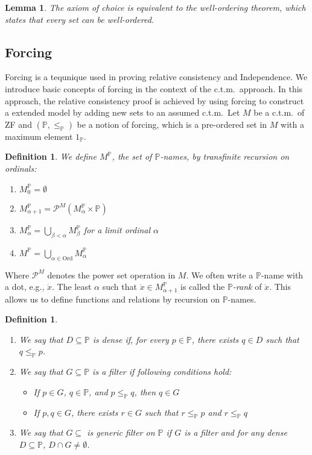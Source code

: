 \documentclass{report}
\newtheorem{lem}[thm]{Lemma}
\newtheorem{dfn}[thm]{Definition}
\begin{document}
\begin{lem}
  The axiom of choice is equivalent to the well-ordering theorem, which states that every set can be well-ordered.
\end{lem}


\subsection{Forcing}
Forcing is a tequnique used in proving relative consistency and Independence.
We introduce basic concepts of forcing in the context of the c.t.m.\  approach.
In this approach, the relative consistency proof is achieved by using forcing to construct a extended model by adding new sets to an assumed c.t.m.\ 
Let $M$ be a c.t.m.\  of ZF and $(\mathbb{P}, \leq_{\mathbb{P}})$ be a notion of forcing, which is a pre-ordered set in $M$ with a maximum element $1_{\mathbb{P}}$.

\begin{dfn}
  We define $M^{\mathbb{P}}$, the set of \emph{$\mathbb{P}$-names}, by transfinite recursion on ordinals:
  \begin{enumerate}
    \item $M^{\mathbb{P}}_0 = \emptyset$
    \item $M^{\mathbb{P}}_{\alpha + 1} = \mathcal{P}^M(M^{\mathbb{P}}_{\alpha} \times \mathbb{P})$
    \item $M^{\mathbb{P}}_{\alpha} = \bigcup_{\beta < \alpha} M^{\mathbb{P}}_{\beta}$ for a limit ordinal $\alpha$
    \item $M^{\mathbb{P}} = \bigcup_{\alpha \in \mathrm{Ord}} M^{\mathbb{P}}_{\alpha}$
  \end{enumerate}
\end{dfn}
Where $\mathcal{P}^M$ denotes the power set operation in $M$. 
We often write a $\mathbb{P}$-name with a dot, e.g., $\dot{x}$.
The least $\alpha$ such that $\dot{x} \in M^{\mathbb{P}}_{\alpha + 1}$ is called the \emph{$\mathbb{P}$-rank} of $\dot{x}$.
This allows us to define functions and relations by recursion on $\mathbb{P}$-names.

\begin{dfn}  
  \,
  \begin{enumerate}
    \item We say that $D \subseteq \mathbb{P}$ is \emph{dense} if, for every $p \in \mathbb{P}$, there exists $q \in D$ such that $q \leq_{\mathbb{P}} p$.
    \item We say that $G \subseteq \mathbb{P}$ is a \emph{filter} if following conditions hold:
      \begin{itemize}
        \item If $p \in G$, $q \in \mathbb{P}$, and $p \leq_{\mathbb{P}} q$, then $q \in G$
        \item If $p, q \in G$, there exists $r \in G$ such that $r \leq_{\mathbb{P}} p$ and $r \leq_{\mathbb{P}} q$
      \end{itemize}
    \item We say that $G \subseteq$ is \emph{generic filter} on $\mathbb{P}$ if $G$ is a filter and for any dense $D \subseteq \mathbb{P}$, $D \cap G \neq \emptyset$.
  \end{enumerate}
\end{dfn}
\end{document}

